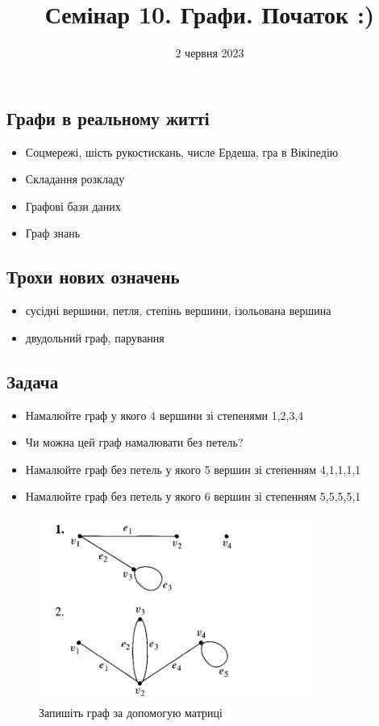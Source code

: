 \documentclass{article}
\begin{document}
\title{Семінар 10. Графи. Початок :)}
\date{2 червня 2023}

\maketitle

\subsection*{Графи в реальному житті}
\begin{itemize}
    \item Соцмережі, шість рукостискань, числе Ердеша, гра в Вікіпедію
    \item Складання розкладу
    \item Графові бази даних
    \item Граф знань
\end{itemize}

\subsection*{Трохи нових означень}
\begin{itemize}
    \item сусідні вершини, петля, степінь вершини, ізольована вершина
    \item двудольний граф, парування
\end{itemize}

\subsection*{Задача}
\begin{itemize}
    \item Намалюйте граф у якого 4 вершини зі степенями 1,2,3,4
    \item Чи можна цей граф намалювати без петель?
    \item Намалюйте граф без петель у якого 5 вершин зі степенням 4,1,1,1,1
    \item Намалюйте граф без петель у якого 6 вершин зі степенням 5,5,5,5,1
\end{itemize}

\begin{figure}[ht!]
\centering
\includegraphics[width=90mm]{1}
\caption{Запишіть граф за допомогую матриці}
\end{figure}
\end{document}
